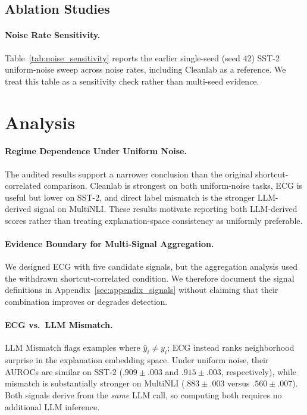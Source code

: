 \documentclass[letterpaper]{article}
\begin{document}
\subsection{Ablation Studies}

\paragraph{Noise Rate Sensitivity.}
Table~\ref{tab:noise_sensitivity} reports the earlier single-seed (seed 42) SST-2 uniform-noise sweep across noise rates, including Cleanlab as a reference.
We treat this table as a sensitivity check rather than multi-seed evidence.



\section{Analysis}
\label{sec:analysis}

\paragraph{Regime Dependence Under Uniform Noise.}
The audited results support a narrower conclusion than the original shortcut-correlated comparison.
Cleanlab is strongest on both uniform-noise tasks, ECG is useful but lower on SST-2, and direct label mismatch is the stronger LLM-derived signal on MultiNLI.
These results motivate reporting both LLM-derived scores rather than treating explanation-space consistency as uniformly preferable.

\paragraph{Evidence Boundary for Multi-Signal Aggregation.}
We designed ECG with five candidate signals, but the aggregation analysis used the withdrawn shortcut-correlated condition.
We therefore document the signal definitions in Appendix~\ref{sec:appendix_signals} without claiming that their combination improves or degrades detection.



\paragraph{ECG vs.\ LLM Mismatch.}
LLM Mismatch flags examples where $\hat{y}_i \neq y_i$; ECG instead ranks neighborhood surprise in the explanation embedding space.
Under uniform noise, their AUROCs are similar on SST-2 ($.909 \pm .003$ and $.915 \pm .003$, respectively), while mismatch is substantially stronger on MultiNLI ($.883 \pm .003$ versus $.560 \pm .007$).
Both signals derive from the \emph{same} LLM call, so computing both requires no additional LLM inference.
\end{document}
